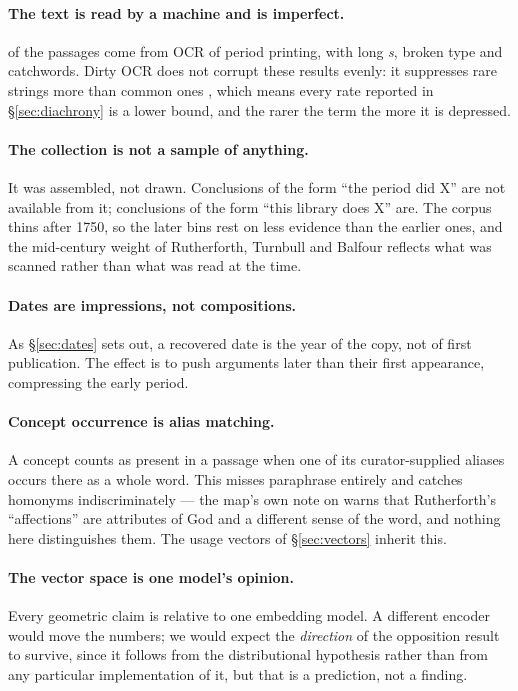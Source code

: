 \paragraph{The text is read by a machine and is imperfect.}
\NOcr{} of the passages come from OCR of period printing, with long
\textit{s}, broken type and catchwords. Dirty OCR does not corrupt these
results evenly: it suppresses rare strings more than common ones
\citep{cordell2017}, which means every rate reported in
\S\ref{sec:diachrony} is a lower bound, and the rarer the term the more it is
depressed.

\paragraph{The collection is not a sample of anything.}
It was assembled, not drawn. Conclusions of the form ``the period did X'' are
not available from it; conclusions of the form ``this library does X'' are.
The corpus thins after 1750, so the later bins rest on less evidence than the
earlier ones, and the mid-century weight of Rutherforth, Turnbull and Balfour
reflects what was scanned rather than what was read at the time.

\paragraph{Dates are impressions, not compositions.}
As \S\ref{sec:dates} sets out, a recovered date is the year of the copy, not
of first publication. The effect is to push arguments later than their first
appearance, compressing the early period.

\paragraph{Concept occurrence is alias matching.}
A concept counts as present in a passage when one of its curator-supplied
aliases occurs there as a whole word. This misses paraphrase entirely and
catches homonyms indiscriminately --- the map's own note on
 warns that Rutherforth's ``affections'' are attributes of
God and a different sense of the word, and nothing here distinguishes them.
The usage vectors of \S\ref{sec:vectors} inherit this.

\paragraph{The vector space is one model's opinion.}
Every geometric claim is relative to one embedding model. A different encoder
would move the numbers; we would expect the \emph{direction} of the opposition
result to survive, since it follows from the distributional hypothesis rather
than from any particular implementation of it, but that is a prediction, not a
finding.

